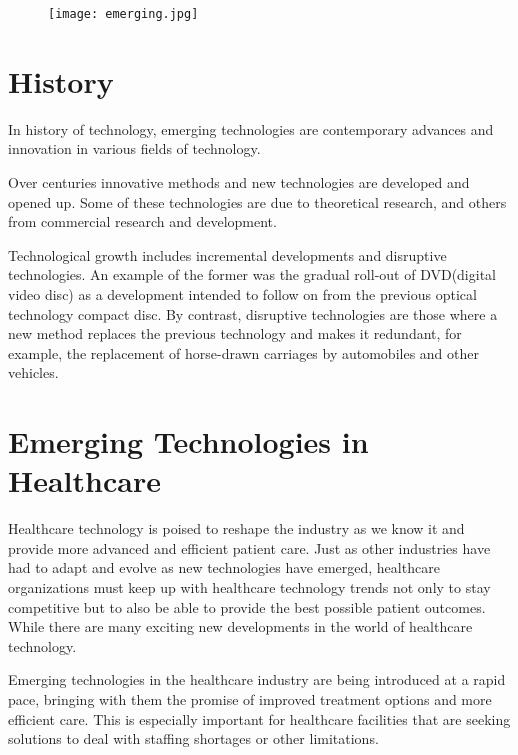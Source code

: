 \documentclass[12pt,a4paper]{article}
\begin{document}
\begin{figure}[h]
\centering
\texttt{[image: emerging.jpg]}
\end{figure}


\section{History}

\hspace{1cm}

In history of technology, emerging technologies are contemporary advances and innovation in various fields of technology.

Over centuries innovative methods and new technologies are developed and opened up. Some of these technologies are due to theoretical research, and others  from commercial research and development.

Technological growth includes incremental developments and disruptive technologies. An example of the former was the gradual roll-out of DVD(digital video disc) as a development intended to follow on from the previous optical technology compact disc. By contrast, disruptive technologies are those where a new method replaces the previous technology and makes it redundant, for example, the replacement of horse-drawn carriages by automobiles and other vehicles.


\section{Emerging Technologies in Healthcare}

\hspace{1cm}

Healthcare technology is poised to reshape the industry as we know it and provide more advanced and efficient patient care. Just as other industries have had to adapt and evolve as new technologies have emerged, healthcare organizations must keep up with healthcare technology trends not only to stay competitive but to also be able to provide the best possible patient outcomes. While there are many exciting new developments in the world of healthcare technology.

Emerging technologies in the healthcare industry are being introduced at a rapid pace, bringing with them the promise of improved treatment options and more efficient care. This is especially important for healthcare facilities that are seeking solutions to deal with staffing shortages or other limitations.
\end{document}
